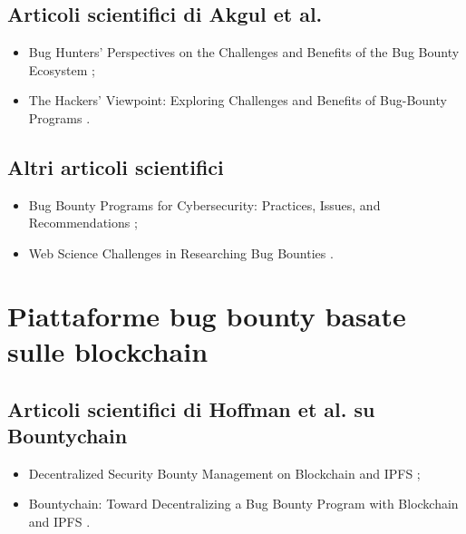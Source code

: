 \subsection*{Articoli scientifici di Akgul et al.}
\begin{itemize}

\item Bug Hunters' Perspectives on the Challenges and Benefits of the Bug Bounty Ecosystem \cite{akgul2023bughunters};

\item The Hackers' Viewpoint: Exploring Challenges and Benefits of Bug-Bounty Programs \cite{akgul2020bughunters}.

\end{itemize}

\subsection*{Altri articoli scientifici}
\begin{itemize}

\item Bug Bounty Programs for Cybersecurity: Practices, Issues, and Recommendations \cite{malladi2020bugbounty};

\item Web Science Challenges in Researching Bug Bounties \cite{fryer2017bugbounty}.

\end{itemize}

\section*{Piattaforme bug bounty basate sulle blockchain}

\subsection*{Articoli scientifici di Hoffman et al. su Bountychain}
\begin{itemize}

\item Decentralized Security Bounty Management on Blockchain and IPFS \cite{hoffman2020bountychain};

\item Bountychain: Toward Decentralizing a Bug Bounty Program with Blockchain and IPFS \cite{hoffman2021bountychain}.

\end{itemize}

